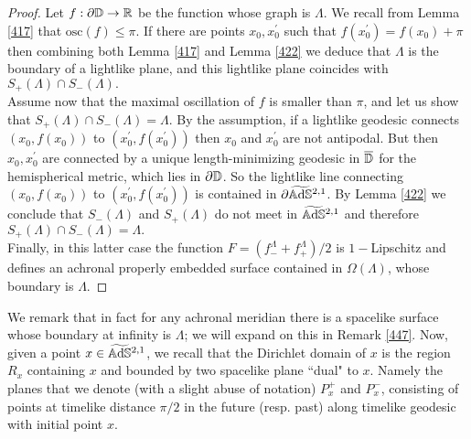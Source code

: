 \begin{proof}
    Let $f:\partial\mathbb{D}\to\mathbb{R}$ be the function whose graph is $\Lambda.$ We recall from Lemma \ref{417} that $\text{osc}(f)\leq\pi$. If there are points $x_0,x_0^{\prime}$ such that $f(x_0^{\prime})=f(x_0)+\pi$ then combining both Lemma \ref{417} and Lemma \ref{422} we deduce that $\Lambda$ is the boundary of a lightlike plane, and this lightlike plane coincides with $S_+(\Lambda)\cap S_-(\Lambda).$\\
    Assume now that the maximal oscillation of $f$ is smaller than $\pi$, and let us show that $S_+(\Lambda)\cap S_-(\Lambda)=\Lambda.$ By the assumption, if a lightlike geodesic connects $(x_0,f(x_0))$ to $(x_0^{\prime} ,f(x_0^{\prime}))$ then $x_0$ and $x_0^{\prime}$ are not antipodal. But then $x_0,x_0^{\prime}$ are connected by a unique length-minimizing geodesic in $\overline{\mathbb{D}}$ for the hemispherical metric, which lies in $\partial\mathbb{D}$. So the lightlike line connecting $(x_0,f(x_0))$ to $(x_0^{\prime},f(x_0^{\prime}))$ is contained in $\partial\widetilde{\mathbb{A}\mathrm{d}\mathbb{S}}{}^{2,1}$. By Lemma \ref{422} we conclude that $S_-(\Lambda)$ and $S_+(\Lambda)$ do not meet in $\widetilde{\mathbb{A}\mathrm{d}\mathbb{S}}{}^{2,1}$ and therefore $S_+(\Lambda)\cap S_-(\Lambda)=\Lambda.$\\
    Finally, in this latter case the function $F=(f^\Lambda_{-}+f^\Lambda_+)/2$ is $1-$Lipschitz and defines an achronal properly embedded surface contained in $\Omega(\Lambda)$, whose boundary is $\Lambda$. 
\end{proof}

We remark that in fact for any achronal meridian there is a spacelike surface whose boundary at infinity is $\Lambda$; we will expand on this in Remark \ref{447}.
Now, given a point $x \in \widetilde{\mathbb{A}\mathrm{d}\mathbb{S}}{}^{2,1}$, we recall that the Dirichlet domain of $x$ is the region $R_x$ containing $x$ and bounded by two spacelike plane “dual" to $x$. Namely the planes that we denote (with a slight abuse of notation) $P_x^+$ and $P_x^-$, consisting of points at timelike distance $\pi/2$ in the future (resp. past) along timelike geodesic with initial point $x$.

